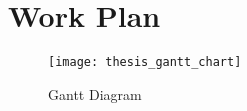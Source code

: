 \chapter{Work Plan} \label{ap1:work_plan}

\begin{sidewaysfigure}
	\centering
	\texttt{[image: thesis\_gantt\_chart]}
	\caption{Gantt Diagram}
	\label{fig:gantt}
\end{sidewaysfigure}
